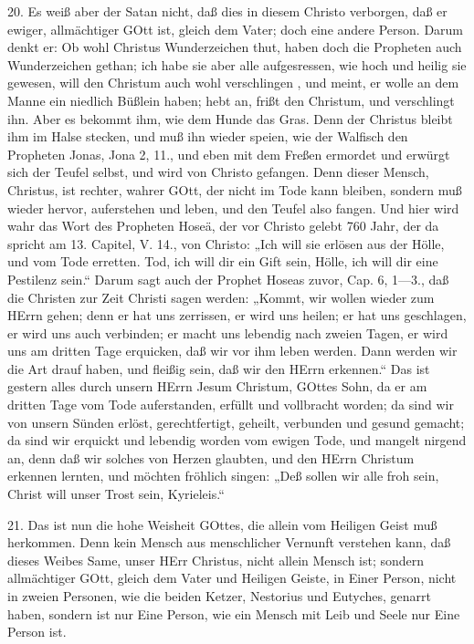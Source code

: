 20. Es weiß aber der Satan nicht, daß dies in diesem Christo verborgen, daß er ewiger, allmächtiger GOtt ist, gleich dem Vater; doch eine andere Person. Darum denkt er: Ob wohl Christus Wunderzeichen thut, haben doch die Propheten auch Wunderzeichen gethan; ich habe sie aber alle aufgesressen, wie hoch und heilig sie gewesen, will den Christum auch wohl verschlingen
, und meint, er wolle an dem Manne ein niedlich Büßlein haben; hebt an, frißt den Christum, und verschlingt ihn. Aber es bekommt ihm, wie dem Hunde das Gras. Denn der Christus bleibt ihm im Halse stecken, und muß ihn wieder speien, wie der Walfisch den Propheten Jonas, Jona 2, 11., und eben mit dem Freßen ermordet und erwürgt sich der Teufel selbst, und wird von Christo gefangen. Denn dieser Mensch, Christus, ist rechter, wahrer GOtt, der nicht im Tode kann bleiben, sondern muß wieder hervor, auferstehen und leben, und den Teufel also fangen. Und hier wird wahr das Wort des Propheten Hoseä, der vor Christo gelebt 760 Jahr, der da spricht am 13. Capitel, V. 14., von Christo: „Ich will sie erlösen aus der Hölle, und vom Tode erretten. Tod, ich will dir ein Gift sein, Hölle, ich will dir eine Pestilenz sein.“ Darum sagt auch der Prophet Hoseas zuvor, Cap. 6, 1—3., daß die Christen zur Zeit Christi sagen werden: „Kommt, wir wollen wieder zum HErrn gehen; denn er hat uns zerrissen, er wird uns heilen; er hat uns geschlagen, er wird uns auch verbinden; er macht uns lebendig nach zweien Tagen, er wird uns am dritten Tage erquicken, daß wir vor ihm leben werden. Dann werden wir die Art drauf haben, und fleißig sein, daß wir den HErrn erkennen.“ Das ist gestern alles durch unsern HErrn Jesum Christum, GOttes Sohn, da er am dritten Tage vom Tode auferstanden, erfüllt und vollbracht worden; da sind wir von unsern Sünden erlöst, gerechtfertigt, geheilt, verbunden und gesund gemacht; da sind wir erquickt und lebendig worden vom ewigen Tode, und mangelt nirgend an, denn daß wir solches von Herzen glaubten, und den HErrn Christum erkennen lernten, und möchten fröhlich singen: „Deß sollen wir alle froh sein, Christ will unser Trost sein, Kyrieleis.“

21. Das ist nun die hohe Weisheit GOttes, die allein vom Heiligen Geist muß herkommen. Denn kein Mensch aus menschlicher Vernunft verstehen kann, daß dieses Weibes Same, unser HErr Christus, nicht allein Mensch ist; sondern allmächtiger GOtt, gleich dem Vater und Heiligen Geiste, in Einer Person, nicht in zweien Personen, wie die beiden Ketzer, Nestorius und Eutyches, genarrt haben, sondern ist nur Eine Person, wie ein Mensch mit Leib und Seele nur Eine Person ist.

